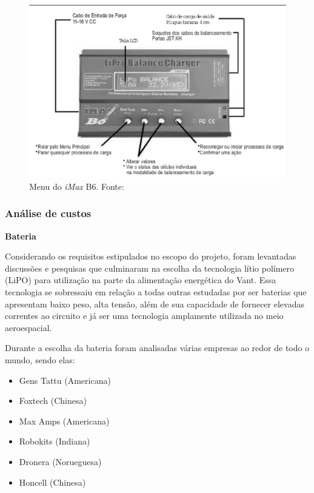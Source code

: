  \begin{figure}[H]
    \centering
	\includegraphics[keepaspectratio=true,scale=0.4]{figuras/manual.eps}
    \caption{Menu do \textit{iMax} B6. Fonte: \cite{ibmax}}
\end{figure}

\subsubsection{Análise de custos}

\textbf{Bateria}

Considerando os requisitos estipulados no escopo do projeto, foram levantadas discussões e pesquisas que culminaram na escolha da tecnologia lítio polímero (LiPO) para utilização na parte da alimentação energética do Vant. Essa tecnologia se sobressaiu em relação a todas outras estudadas por ser baterias que apresentam baixo peso, alta tensão, além de sua capacidade de fornecer elevadas correntes ao circuito e já ser uma tecnologia amplamente utilizada no meio aeroespacial.

Durante a escolha da bateria foram analisadas várias empresas ao redor de todo o mundo, sendo elas:

\begin{itemize}
 
\item Gens Tattu (Americana)

\item Foxtech (Chinesa)

\item Max Amps (Americana)

\item Robokits (Indiana)

\item Dronera (Norueguesa)

\item Honcell (Chinesa)

\end{itemize}

